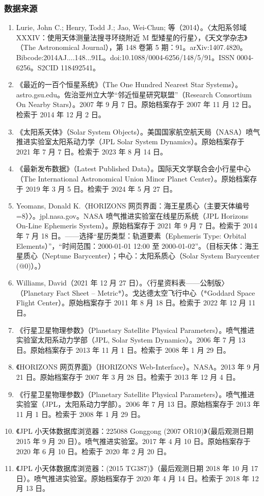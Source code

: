 \subsubsection{数据来源}
\begin{enumerate}
\item Lurie, John C.; Henry, Todd J.; Jao, Wei-Chun; 等（2014）。〈太阳系邻域 XXXIV：使用天体测量法搜寻环绕附近 M 型矮星的行星〉，《天文学杂志》（The Astronomical Journal），第 148 卷第 5 期：91。arXiv:1407.4820。Bibcode:2014AJ....148...91L。doi:10.1088/0004-6256/148/5/91。ISSN 0004-6256。S2CID 118492541。
\item 《最近的一百个恒星系统》（The One Hundred Nearest Star Systems）。astro.gsu.edu。佐治亚州立大学“邻近恒星研究联盟”（Research Consortium On Nearby Stars）。2007 年 9 月 7 日。原始档案存于 2007 年 11 月 12 日。检索于 2014 年 12 月 2 日。
\item 《太阳系天体》（Solar System Objects）。美国国家航空航天局（NASA）喷气推进实验室太阳系动力学（JPL Solar System Dynamics）。原始档案存于 2021 年 7 月 7 日。检索于 2023 年 8 月 14 日。
\item 《最新发布数据》（Latest Published Data）。国际天文学联合会小行星中心（The International Astronomical Union Minor Planet Center）。原始档案存于 2019 年 3 月 5 日。检索于 2024 年 5 月 27 日。
\item Yeomans, Donald K.〈HORIZONS 网页界面：海王星质心（主要天体编号=8）〉。jpl.nasa.gov。NASA 喷气推进实验室在线星历系统（JPL Horizons On-Line Ephemeris System）。原始档案存于 2021 年 9 月 7 日。检索于 2014 年 7 月 18 日。——选择“星历类型：轨道要素（Ephemeris Type: Orbital Elements）”，“时间范围：2000-01-01 12:00 至 2000-01-02”。（目标天体：海王星质心（Neptune Barycenter）；中心：太阳系质心（Solar System Barycenter (@0)）。）
\item Williams, David（2021 年 12 月 27 日）。〈行星资料表——公制版〉（Planetary Fact Sheet – Metric*）。戈达德太空飞行中心（*Goddard Space Flight Center）。原始档案存于 2011 年 8 月 18 日。检索于 2022 年 12 月 11 日。
\item 《行星卫星物理参数》（Planetary Satellite Physical Parameters）。喷气推进实验室太阳系动力学部（JPL, Solar System Dynamics）。2006 年 7 月 13 日。原始档案存于 2013 年 11 月 1 日。检索于 2008 年 1 月 29 日。
\item 《HORIZONS 网页界面》（HORIZONS Web-Interface）。NASA。2013 年 9 月 21 日。原始档案存于 2007 年 3 月 28 日。检索于 2013 年 12 月 4 日。
\item 《行星卫星物理参数》（Planetary Satellite Physical Parameters）。喷气推进实验室（JPL，太阳系动力学部）。2006 年 7 月 13 日。原始档案存于 2013 年 11 月 1 日。检索于 2008 年 1 月 29 日。
\item 《JPL 小天体数据库浏览器：225088 Gonggong (2007 OR10)》（最后观测日期 2015 年 9 月 20 日）。喷气推进实验室。2017 年 4 月 10 日。原始档案存于 2020 年 6 月 10 日。检索于 2020 年 2 月 20 日。
\item 《JPL 小天体数据库浏览器：(2015 TG387)》（最后观测日期 2018 年 10 月 17 日）。喷气推进实验室。原始档案存于 2020 年 4 月 14 日。检索于 2018 年 12 月 13 日。
\end{enumerate}
